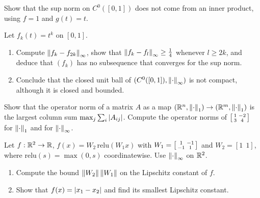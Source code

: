 \begin{notechapter}
\begin{exercise}\label{norms-banach:exr:2}
Show that the sup norm on $C^0([0, 1])$ does not come from an inner
product, using $f = 1$ and $g(t) = t$.
\end{exercise}

\begin{exercise}\label{norms-banach:exr:3}
Let $f_k(t) = t^k$ on $[0, 1]$.
\begin{enumerate}[nosep]
  \item Compute $\left\|f_k - f_{2k}\right\|_\infty$, show that
        $\left\|f_k - f_l\right\|_\infty\geq\frac14$ whenever $l\geq2k$, and
        deduce that $(f_k)$ has no subsequence that converges for the sup
        norm.
  \item Conclude that the closed unit ball of
        $(C^0([0, 1]), \left\|\cdot\right\|_\infty)$ is not compact, although it is
        closed and bounded.
\end{enumerate}
\end{exercise}

\begin{exercise}\label{norms-banach:exr:4}
Show that the operator norm of a matrix $A$ as a map
$(\mathbb{R}^n, \left\|\cdot\right\|_1)\to(\mathbb{R}^m, \left\|\cdot\right\|_1)$ is the largest column sum
$\max_j\sum_i\left|A_{ij}\right|$. Compute the operator norms of
$\begin{bsmallmatrix}1 & -2\\3 & 4\end{bsmallmatrix}$ for $\left\|\cdot\right\|_1$
and for $\left\|\cdot\right\|_\infty$.
\end{exercise}

\begin{exercise}\label{norms-banach:exr:5}
Let $f:\mathbb{R}^2\to\mathbb{R}$, $f(x) = W_2\,\mathrm{relu}(W_1x)$ with
$W_1 = \begin{bsmallmatrix}1 & -1\\-1 & 1\end{bsmallmatrix}$ and
$W_2 = [1\ \ 1]$, where $\mathrm{relu}(s) = \max(0, s)$ coordinatewise. Use
$\left\|\cdot\right\|_\infty$ on $\mathbb{R}^2$.
\begin{enumerate}[nosep]
  \item Compute the bound $\left\|W_2\right\|\left\|W_1\right\|$ on the Lipschitz constant
        of $f$.
  \item Show that $f(x) = \left|x_1 - x_2\right|$ and find its smallest Lipschitz
        constant.
\end{enumerate}
\end{exercise}


\end{notechapter}
